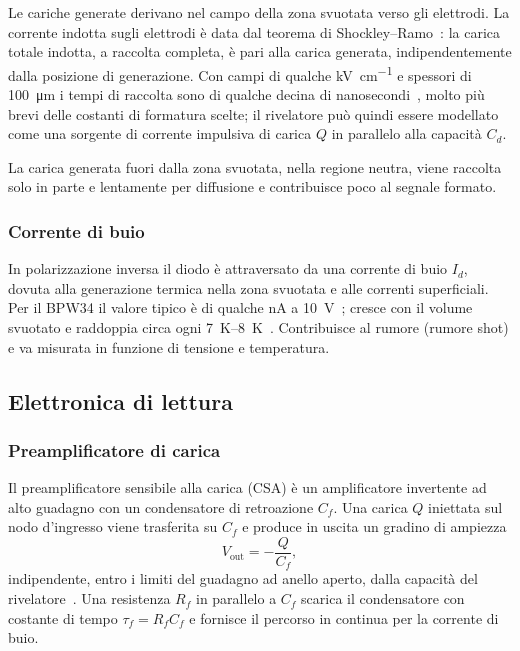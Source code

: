 \documentclass[11pt,a4paper]{article}
\begin{document}
Le cariche generate derivano nel campo della zona svuotata verso gli elettrodi. La corrente indotta sugli elettrodi è data dal teorema di Shockley--Ramo~\cite{shockley1938,ramo1939}: la carica totale indotta, a raccolta completa, è pari alla carica generata, indipendentemente dalla posizione di generazione. Con campi di qualche \si{\kilo\volt\per\centi\metre} e spessori di \SI{100}{\micro\metre} i tempi di raccolta sono di qualche decina di nanosecondi~\cite{spieler2005}, molto più brevi delle costanti di formatura scelte; il rivelatore può quindi essere modellato come una sorgente di corrente impulsiva di carica $Q$ in parallelo alla capacità $C_d$.

La carica generata fuori dalla zona svuotata, nella regione neutra, viene raccolta solo in parte e lentamente per diffusione e contribuisce poco al segnale formato.

\subsubsection{Corrente di buio}

In polarizzazione inversa il diodo è attraversato da una corrente di buio $I_d$, dovuta alla generazione termica nella zona svuotata e alle correnti superficiali. Per il BPW34 il valore tipico è di qualche \si{\nano\ampere} a \SI{10}{\volt}~\cite{bpw34}; cresce con il volume svuotato e raddoppia circa ogni \SIrange{7}{8}{\kelvin}~\cite{lutz1999,spieler2005}. Contribuisce al rumore (rumore shot) e va misurata in funzione di tensione e temperatura.

\subsection{Elettronica di lettura}

\subsubsection{Preamplificatore di carica}

Il preamplificatore sensibile alla carica (CSA) è un amplificatore invertente ad alto guadagno con un condensatore di retroazione $C_f$. Una carica $Q$ iniettata sul nodo d'ingresso viene trasferita su $C_f$ e produce in uscita un gradino di ampiezza
\begin{equation}
  V_{\mathrm{out}} = -\frac{Q}{C_f},
\end{equation}
indipendente, entro i limiti del guadagno ad anello aperto, dalla capacità del rivelatore~\cite{knoll2010,spieler2005}. Una resistenza $R_f$ in parallelo a $C_f$ scarica il condensatore con costante di tempo $\tau_f = R_f C_f$ e fornisce il percorso in continua per la corrente di buio.
\end{document}
